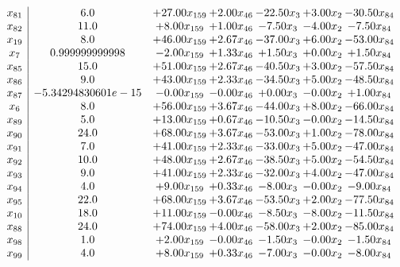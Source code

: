 \documentclass[8pt]{article}
\begin{document}
\[\begin{array}{c| c c@{\hskip 2pt} c@{\hskip 2pt} c@{\hskip 2pt} c@{\hskip 2pt} c@{\hskip 2pt} }
 x_{81}   &  6.0 & + 27.00 x_{159} & +  2.00 x_{46} & -22.50 x_{3} & +  3.00 x_{2} & -30.50 x_{84}\\
 x_{82}   &  11.0 & +  8.00 x_{159} & +  1.00 x_{46} & -7.50 x_{3} & -4.00 x_{2} & -7.50 x_{84}\\
 x_{19}   &  8.0 & + 46.00 x_{159} & +  2.67 x_{46} & -37.00 x_{3} & +  6.00 x_{2} & -53.00 x_{84}\\
 x_{7}   &  0.999999999998 & -2.00 x_{159} & +  1.33 x_{46} & +  1.50 x_{3} & +  0.00 x_{2} & +  1.50 x_{84}\\
 x_{85}   &  15.0 & + 51.00 x_{159} & +  2.67 x_{46} & -40.50 x_{3} & +  3.00 x_{2} & -57.50 x_{84}\\
 x_{86}   &  9.0 & + 43.00 x_{159} & +  2.33 x_{46} & -34.50 x_{3} & +  5.00 x_{2} & -48.50 x_{84}\\
 x_{87}   &  -5.34294830601e-15 & -0.00 x_{159} & -0.00 x_{46} & +  0.00 x_{3} & -0.00 x_{2} & +  1.00 x_{84}\\
 x_{6}   &  8.0 & + 56.00 x_{159} & +  3.67 x_{46} & -44.00 x_{3} & +  8.00 x_{2} & -66.00 x_{84}\\
 x_{89}   &  5.0 & + 13.00 x_{159} & +  0.67 x_{46} & -10.50 x_{3} & -0.00 x_{2} & -14.50 x_{84}\\
 x_{90}   &  24.0 & + 68.00 x_{159} & +  3.67 x_{46} & -53.00 x_{3} & +  1.00 x_{2} & -78.00 x_{84}\\
 x_{91}   &  7.0 & + 41.00 x_{159} & +  2.33 x_{46} & -33.00 x_{3} & +  5.00 x_{2} & -47.00 x_{84}\\
 x_{92}   &  10.0 & + 48.00 x_{159} & +  2.67 x_{46} & -38.50 x_{3} & +  5.00 x_{2} & -54.50 x_{84}\\
 x_{93}   &  9.0 & + 41.00 x_{159} & +  2.33 x_{46} & -32.00 x_{3} & +  4.00 x_{2} & -47.00 x_{84}\\
 x_{94}   &  4.0 & +  9.00 x_{159} & +  0.33 x_{46} & -8.00 x_{3} & -0.00 x_{2} & -9.00 x_{84}\\
 x_{95}   &  22.0 & + 68.00 x_{159} & +  3.67 x_{46} & -53.50 x_{3} & +  2.00 x_{2} & -77.50 x_{84}\\
 x_{10}   &  18.0 & + 11.00 x_{159} & -0.00 x_{46} & -8.50 x_{3} & -8.00 x_{2} & -11.50 x_{84}\\
 x_{88}   &  24.0 & + 74.00 x_{159} & +  4.00 x_{46} & -58.00 x_{3} & +  2.00 x_{2} & -85.00 x_{84}\\
 x_{98}   &  1.0 & +  2.00 x_{159} & -0.00 x_{46} & -1.50 x_{3} & -0.00 x_{2} & -1.50 x_{84}\\
 x_{99}   &  4.0 & +  8.00 x_{159} & +  0.33 x_{46} & -7.00 x_{3} & -0.00 x_{2} & -8.00 x_{84}\\

\end{array}\]
\end{document}
